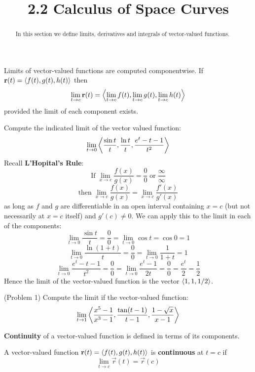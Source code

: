 \documentclass[handout]{ximera}
\title{2.2 Calculus of Space Curves}
\begin{document}
\begin{abstract}
In this section we define limits, derivatives and integrals of vector-valued functions.
\end{abstract}

\maketitle

\begin{definition}
Limits of vector-valued functions are computed componentwise. If $\mathbf r(t) = \left\langle f(t), g(t), h(t)\right\rangle$ then
\[
\lim_{t \to c} \mathbf r(t) = \left\langle \lim_{t \to c}f(t), \lim_{t \to c}g(t),\lim_{t \to c} h(t)\right\rangle
\]
provided the limit of each component exists.
\end{definition}

\begin{example}[Example 1]
Compute the indicated limit of the vector valued function:
\[
\lim_{t \to 0} \left\langle \frac{\sin t}{t}, \frac{\ln t}{t}, \frac{e^t - t -1}{t^2}\right\rangle
\]
Recall \textbf{L'Hopital's Rule}:
\[
\text{If}\; \lim_{x \to c} \frac{f(x)}{g(x)} = \frac00 \; \text{or} \; \frac{\infty}{\infty} 
\]
\[
\text{then} \; \lim_{x \to c} \frac{f(x)}{g(x)} = \lim_{x \to c} \frac{f'(x)}{g'(x)}
\]
as long as $f$ and $g$ are differentiable in an open interval containing $x = c$ (but not necessarily at $x = c$ itself)
and $g'(c) \neq 0$. We can apply this to the limit in each of the components:
\[
\lim_{t \to 0} \frac{\sin t}{t} = \frac00 = \lim_{t\to 0} \cos t = \cos 0  = 1
\]
\[
\lim_{t \to 0} \frac{\ln(1+t)}{t} = \frac00 = \lim_{t\to 0} \frac{1}{1+t} = 1
\]
\[
\lim_{t \to 0} \frac{e^t - t - 1}{t^2} = \frac00 = \lim_{t\to 0} \frac{e^t - 1}{2t} = \frac00 = \frac{e^t}{2}  = \frac12
\]
Hence the limit of the vector-valued function is the vector $\left\langle 1, 1, 1/2\right\rangle$.
\end{example}

\begin{problem}(Problem 1)
Compute the limit if the vector-valued function:
\[
\lim_{t \to 1} \left\langle \frac{x^5 - 1}{x^3 - 1}, \frac{\tan(t-1)}{t-1}, \frac{1 - \sqrt x}{x-1}\right\rangle
\]
\end{problem}

\textbf{Continuity} of a vector-valued function is defined in terms of its components.

\begin{definition}
A vector-valued function $\mathbf r(t) = \left\langle f(t), g(t), h(t)\right\rangle$ is
\textbf{continuous} at $t = c$ if
\[
\lim_{t \to c} \vec r(t) = \vec r(c)
\]
\end{definition}
\end{document}
